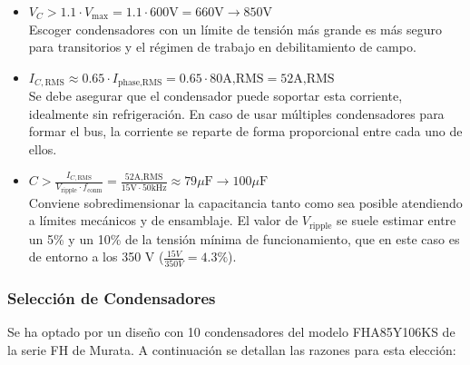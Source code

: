 \begin{itemize}
	\item \( V_C > 1.1 \cdot V_{\text{max}} = 1.1 \cdot 600 \text{V} = 660 \text{V} \rightarrow 850 \text{V} \) \\
		Escoger condensadores con un límite de tensión más grande es más seguro para transitorios y el régimen de trabajo en debilitamiento de campo.
	\item \( I_{C,\text{RMS}} \approx 0.65 \cdot I_{\text{phase,RMS}} = 0.65 \cdot 80 \text{A,RMS} = 52 \text{A,RMS}\) \\
		Se debe asegurar que el condensador puede soportar esta corriente, idealmente sin refrigeración. En caso de usar múltiples condensadores para formar el bus, la corriente se reparte de forma proporcional entre cada uno de ellos.
	\item \( C > \frac{I_{C,\text{RMS}}}{V_{\text{ripple}} \cdot f_{\text{conm}}} = \frac{52 \text{A,RMS}}{15 \text{V} \cdot 50 \text{kHz}} \approx 79 \mu\text{F} \rightarrow 100 \mu\text{F} \)\\
		Conviene sobredimensionar la capacitancia tanto como sea posible atendiendo a límites mecánicos y de ensamblaje. El valor de $V_{\text{ripple}}$ se suele estimar entre un 5\% y un 10\% de la tensión mínima de funcionamiento, que en este caso es de entorno a los 350 V ($\frac{15 V}{350 V} = 4.3\%$).
\end{itemize}

\subsubsection{Selección de Condensadores}

Se ha optado por un diseño con 10 condensadores del modelo FHA85Y106KS de la serie FH de Murata. A continuación se detallan las razones para esta elección:


